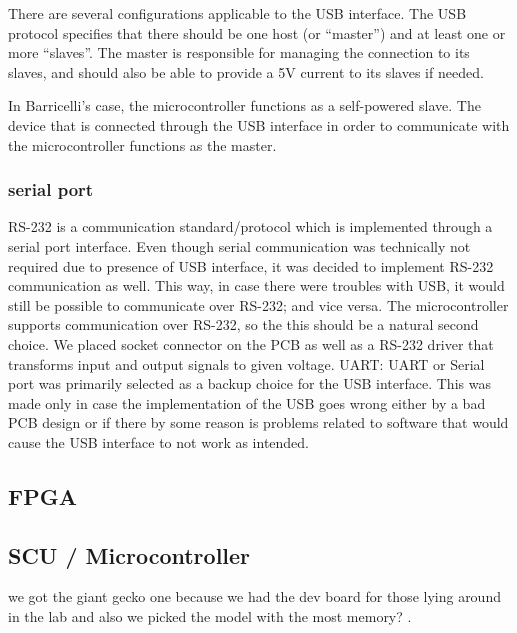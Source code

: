 There are several configurations applicable to the USB interface.
The USB protocol specifies that there should be one host (or ``master'') and at least one or more ``slaves''.
The master is responsible for managing the connection to its slaves, and should also be able to provide a 5V current to its slaves if needed.

In Barricelli's case, the microcontroller functions as a self-powered slave.
The device that is connected through the USB interface in order to communicate with the microcontroller functions as the master.



\subsubsection{serial port} 

RS-232 is a communication standard/protocol which is implemented through a serial port interface.
Even though serial communication was technically not required due to presence of USB interface, it was decided to implement RS-232 communication as well.
This way, in case there were troubles with USB, it would still be possible to communicate over RS-232; and vice versa.
The microcontroller supports communication over RS-232, so the this should be a natural second choice.
We placed socket connector on the PCB as well as a RS-232 driver that transforms input and output signals to given voltage.
UART: UART or Serial port was primarily selected as a backup choice for the USB interface. This was made only in case the implementation
of the USB goes wrong either by a bad PCB design or if there by some reason is problems related to software that would cause the USB interface to not work as intended.


\subsection{FPGA} \label{pcb:design-choices:ss:fpga}


\subsection{SCU / Microcontroller} \label{pcb:design-choices:ss:scu}
we got the giant gecko one because we had the dev board for those lying around in the lab and also we picked the model with the most memory? .

